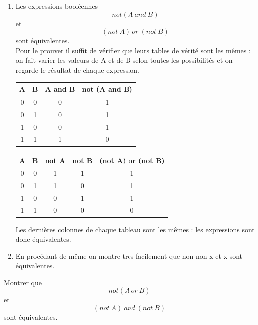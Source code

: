 \documentclass[a4paper,12pt,french]{book}
\begin{document}
\begin{exemple}[s]
	\begin{enumerate}[\textbullet]
		\item 		Les expressions booléennes $$not(A\ and\ B)$$ et $$(not\ A)\ or\ (not\ B)$$ sont équivalentes.\\
		Pour le prouver il suffit de vérifier que leurs tables de vérité sont les mêmes : on fait varier les valeurs de A et de B selon toutes les possibilités et on regarde le résultat de chaque expression.
		\begin{center}
			\begin{tabular}{|c|c|c|c|}
				\hline\rowcolor{lightgray}
				A 	& B 	&  A and B	& not (A and B) \\
				\hline
				0 	& 0 	& 	0   	& \cellcolor{orange@color!25}	1         \\
				\hline
				0 	& 1 	& 	0   	& \cellcolor{orange@color!25}	1         \\
				\hline
				1 	& 0 	& 	0   	& \cellcolor{orange@color!25}	1         \\
				\hline
				1 	& 1 	& 	1   	& \cellcolor{orange@color!25}	0         \\
				\hline
			\end{tabular}\hspace{2em}
			\begin{tabular}{|c|c|c|c|c|}
				\hline\rowcolor{lightgray}
				A 	& B 	&  not A & not B	& (not A) or (not B)  \\
				\hline
				0 	& 0 	& 	1   & 	1       & \cellcolor{orange@color!25}	1\\
				\hline
				0 	& 1 	& 	1   & 	0       & \cellcolor{orange@color!25}	1\\
				\hline
				1 	& 0 	& 	0   & 	1       & \cellcolor{orange@color!25}	1\\
				\hline
				1 	& 1 	& 	0   & 	0 		&\cellcolor{orange@color!25}  0 \\
				\hline
			\end{tabular}
		\end{center}
		Les dernières colonnes de chaque tableau sont les mêmes : les expressions sont donc équivalentes.
		\item 	En procédant de même on montre très facilement que \og non non x\fg{} et \og x\fg{} sont équivalentes.	
	\end{enumerate}

\end{exemple}

\begin{exercice}[]
	Montrer que  $$not(A\ or\ B)$$ et $$(not\ A)\ and\ (not\ B)$$ sont équivalentes.\\
\end{exercice}
\end{document}
